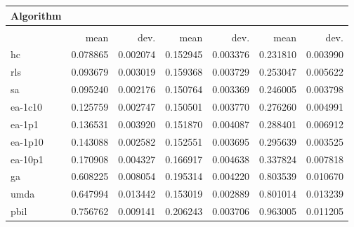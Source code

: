 \begin{tabular}{@{} l *{6}{>{{}}N{1}{2}} @{}}
\toprule
{Algorithm} &  \\
\midrule
&  &  &  \\
\midrule
& {mean} & {dev.} & {mean} & {dev.} & {mean} & {dev.} \\
\midrule
hc & 0.078865 & 0.002074 & 0.152945 & 0.003376 & 0.231810 & 0.003990 \\
rls & 0.093679 & 0.003019 & 0.159368 & 0.003729 & 0.253047 & 0.005622 \\
sa & 0.095240 & 0.002176 & 0.150764 & 0.003369 & 0.246005 & 0.003798 \\
ea-1c10 & 0.125759 & 0.002747 & 0.150501 & 0.003770 & 0.276260 & 0.004991 \\
ea-1p1 & 0.136531 & 0.003920 & 0.151870 & 0.004087 & 0.288401 & 0.006912 \\
ea-1p10 & 0.143088 & 0.002582 & 0.152551 & 0.003695 & 0.295639 & 0.003525 \\
ea-10p1 & 0.170908 & 0.004327 & 0.166917 & 0.004638 & 0.337824 & 0.007818 \\
ga & 0.608225 & 0.008054 & 0.195314 & 0.004220 & 0.803539 & 0.010670 \\
umda & 0.647994 & 0.013442 & 0.153019 & 0.002889 & 0.801014 & 0.013239 \\
pbil & 0.756762 & 0.009141 & 0.206243 & 0.003706 & 0.963005 & 0.011205 \\
\bottomrule
\end{tabular}
